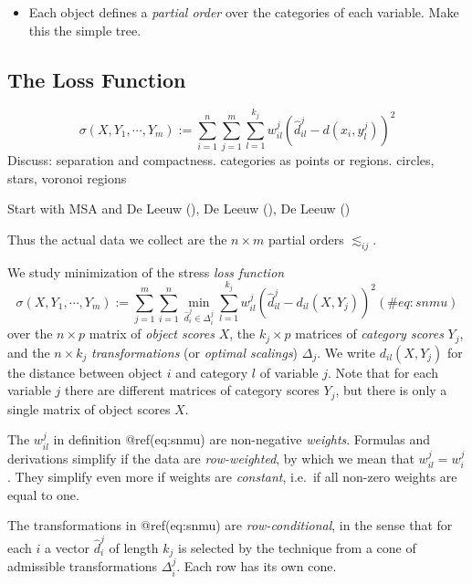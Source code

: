 \documentclass[
  12pt,
  letterpaper,
  DIV=11,
  numbers=noendperiod]{scrartcl}
\providecommand{\tightlist}{%
  \setlength{\itemsep}{0pt}\setlength{\parskip}{0pt}}\usepackage{longtable,booktabs,array}
\begin{document}
\begin{itemize}
\tightlist
\item
  Each object defines a \emph{partial order} over the categories of each
  variable. Make this the simple tree.
\end{itemize}

\subsection{The Loss Function}\label{the-loss-function}

\[
\sigma(X,Y_1,\cdots,Y_m):=\sum_{i=1}^n\sum_{j=1}^m\sum_{l=1}^{k_j}w^j_{il}(\hat d^j_{il}-d(x_i,y^j_l))^2
\] Discuss: separation and compactness. categories as points or regions.
circles, stars, voronoi regions

Start with MSA and De Leeuw (), De
Leeuw (), De Leeuw
()

Thus the actual data we collect are the \(n\times m\) partial orders
\(\lesssim_{ij}\).

We study minimization of the stress \emph{loss function}
\begin{equation}
\sigma(X,Y_1,\cdots,Y_m):=\sum_{j=1}^m\sum_{i=1}^n\min_{\hat d_i^j\in\Delta_i^j}\sum_{l=1}^{k_j}w_{il}^j(\hat d_{il}^j-d_{il}(X,Y_j))^2
(\#eq:snmu)
\end{equation} over the \(n\times p\) matrix of \emph{object scores}
\(X\), the \(k_j\times p\) matrices of \emph{category scores} \(Y_j\),
and the \(n\times k_j\) \emph{transformations} (or \emph{optimal
scalings}) \(\Delta_j\). We write \(d_{il}(X,Y_j)\) for the distance
between object \(i\) and category \(l\) of variable \(j\). Note that for
each variable \(j\) there are different matrices of category scores
\(Y_j\), but there is only a single matrix of object scores \(X\).

The \(w_{il}^j\) in definition @ref(eq:snmu) are non-negative
\emph{weights}. Formulas and derivations simplify if the data are
\emph{row-weighted}, by which we mean that \(w_{il}^j=w_i^j\). They
simplify even more if weights are \emph{constant}, i.e.~if all non-zero
weights are equal to one.

The transformations in @ref(eq:snmu) are \emph{row-conditional}, in the
sense that for each \(i\) a vector \(\hat d_i^j\) of length \(k_j\) is
selected by the technique from a cone of admissible transformations
\(\Delta_i^j\). Each row has its own cone.
\end{document}
